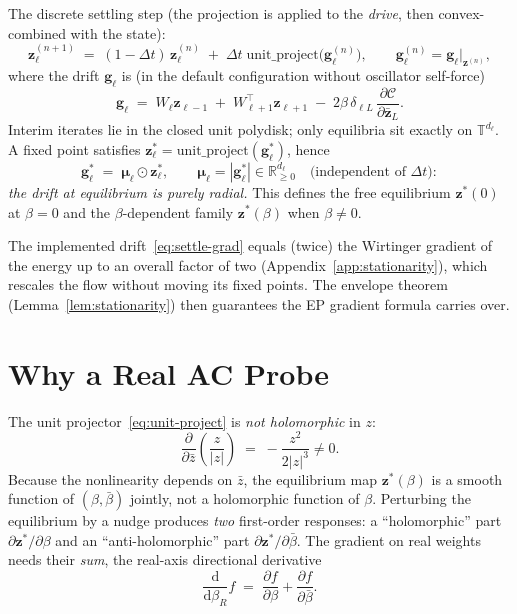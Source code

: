 \documentclass[11pt]{article}
\newcommand{\R}{\mathbb{R}}
\newcommand{\T}{\mathbb{T}}
\newcommand{\dd}{\mathrm{d}}
\newcommand{\dt}{\Delta t}
\theoremstyle{definition}
\begin{document}
The discrete settling step (the projection is applied to the
\emph{drive}, then convex-combined with the state):
\begin{equation}\label{eq:settle-step}
  \bm{z}_\ell^{(n+1)}
  \;=\;
  (1-\dt)\,\bm{z}_\ell^{(n)}
  \;+\;
  \dt\;\mathrm{unit\_project}\!\bigl(\bm{g}_\ell^{(n)}\bigr),
  \qquad
  \bm{g}_\ell^{(n)} = \bm{g}_\ell\bigr|_{\bm{z}^{(n)}},
\end{equation}
where the drift $\bm{g}_\ell$ is (in the default configuration without
oscillator self-force)
\begin{equation}\label{eq:settle-grad}
  \bm{g}_\ell
  \;=\;
  W_\ell\bm{z}_{\ell-1}
  \;+\;
  W_{\ell+1}^{\!\top}\bm{z}_{\ell+1}
  \;-\;
  2\beta\,\delta_{\ell L}\,
  \frac{\partial\mathcal{C}}{\partial\bar{\bm{z}}_L}.
\end{equation}
Interim iterates lie in the closed unit polydisk; only equilibria sit
exactly on $\T^{d_\ell}$.  A fixed point satisfies
$\bm{z}_\ell^* = \mathrm{unit\_project}(\bm{g}_\ell^*)$, hence
\begin{equation}\label{eq:radial-fp}
  \bm{g}_\ell^* \;=\; \bm{\mu}_\ell\odot\bm{z}_\ell^*,
  \qquad \bm{\mu}_\ell = |\bm{g}_\ell^*| \in \R_{\ge 0}^{d_\ell}
  \quad\text{(independent of $\dt$)}:
\end{equation}
\emph{the drift at equilibrium is purely radial.}  This defines the
free equilibrium $\bm{z}^*(0)$ at $\beta=0$ and the $\beta$-dependent
family $\bm{z}^*(\beta)$ when $\beta \ne 0$.

The implemented drift~\eqref{eq:settle-grad} equals (twice) the
Wirtinger gradient of the energy up to an overall factor of two
(Appendix~\ref{app:stationarity}), which rescales the flow without
moving its fixed points.  The envelope theorem (Lemma~\ref{lem:stationarity})
then guarantees the EP gradient formula carries over.

\section{Why a Real AC Probe}\label{sec:why-real-probe}

The unit projector~\eqref{eq:unit-project} is \emph{not holomorphic}
in $z$:
\[
  \frac{\partial}{\partial \bar z}\!\left(\frac{z}{|z|}\right)
  \;=\; -\frac{z^2}{2|z|^3} \ne 0.
\]
Because the nonlinearity depends on $\bar z$, the equilibrium map
$\bm{z}^*(\beta)$ is a smooth function of $(\beta,\bar\beta)$ jointly,
not a holomorphic function of $\beta$.  Perturbing the equilibrium by
a nudge produces \emph{two} first-order responses: a
``holomorphic'' part $\partial\bm{z}^*/\partial\beta$ and an
``anti-holomorphic'' part $\partial\bm{z}^*/\partial\bar\beta$.  The
gradient on real weights needs their \emph{sum}, the real-axis
directional derivative
\begin{equation}\label{eq:real-dir}
  \frac{\dd}{\dd\beta_R} f
  \;=\;
  \frac{\partial f}{\partial\beta} + \frac{\partial f}{\partial\bar\beta}.
\end{equation}
\end{document}
